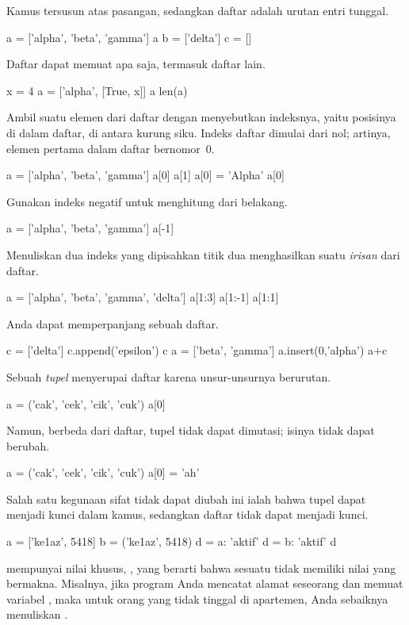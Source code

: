 Kamus tersusun atas pasangan, sedangkan daftar \python{} adalah urutan entri tunggal.
\begin{pythonconsole}
a = ['alpha', 'beta', 'gamma']
a
b = ['delta']
c = []
\end{pythonconsole}
Daftar dapat memuat apa saja, termasuk daftar lain.
\begin{pythonconsole}
x = 4
a = ['alpha', [True, x]]
a
len(a)
\end{pythonconsole}
Ambil suatu elemen dari daftar dengan menyebutkan indeksnya, yaitu posisinya di dalam daftar,
di antara kurung siku.
Indeks daftar dimulai dari nol; artinya, elemen pertama dalam
daftar bernomor~$0$.
\begin{pythonconsole}
a = ['alpha', 'beta', 'gamma']
a[0]
a[1]
a[0] = 'Alpha'
a[0]
\end{pythonconsole}
Gunakan indeks negatif untuk menghitung dari belakang.
\begin{pythonconsole}
a = ['alpha', 'beta', 'gamma']
a[-1]
\end{pythonconsole}
Menuliskan dua indeks yang dipisahkan titik dua menghasilkan suatu \textit{irisan} 
dari daftar. 
\begin{pythonconsole} 
a = ['alpha', 'beta', 'gamma', 'delta']
a[1:3]
a[1:-1]
a[1:1]
\end{pythonconsole}
Anda dapat memperpanjang sebuah daftar.
\begin{pythonconsole}
c = ['delta']
c.append('epsilon')
c
a = ['beta', 'gamma']
a.insert(0,'alpha')
a+c
\end{pythonconsole}

Sebuah \textit{tupel} menyerupai daftar karena unsur-unsurnya berurutan.
\begin{pythonconsole}
a = ('cak', 'cek', 'cik', 'cuk')
a[0]
\end{pythonconsole}
Namun, berbeda dari daftar, tupel 
tidak dapat dimutasi; isinya tidak dapat berubah.
\begin{pythonconsole}
a = ('cak', 'cek', 'cik', 'cuk')
a[0] = 'ah'
\end{pythonconsole}
Salah satu kegunaan sifat tidak dapat diubah ini ialah bahwa 
tupel dapat menjadi kunci dalam kamus, sedangkan daftar tidak dapat menjadi kunci.
\begin{pythonconsole}
a = ['ke1az', 5418]
b = ('ke1az', 5418)
d = {a: 'aktif'}
d = {b: 'aktif'}
d
\end{pythonconsole}

\python{} mempunyai nilai khusus, , yang
berarti bahwa sesuatu tidak memiliki nilai yang bermakna.
Misalnya, jika program Anda mencatat alamat seseorang dan
memuat variabel , maka   
untuk orang yang tidak tinggal di
apartemen, Anda sebaiknya menuliskan .



